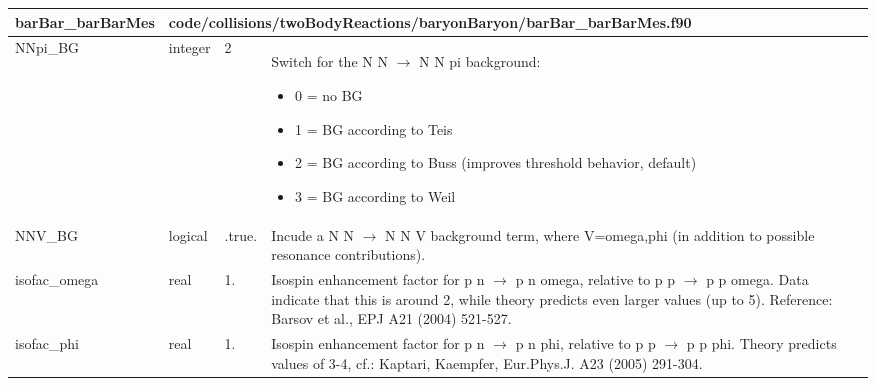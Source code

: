 \documentclass{article}
\begin{document}
\begin{longtable}{llll}
\toprule
\textbf{\large{barBar\_barBarMes}} & \multicolumn{3}{l}{\footnotesize{code/collisions/twoBodyReactions/baryonBaryon/barBar\_barBarMes.f90}}\\*
\midrule
\endfirsthead
\midrule
\endhead
NNpi\_BG & \begin{minipage}[t]{2cm}integer\end{minipage} & \begin{minipage}[t]{2cm}2\end{minipage} & \begin{minipage}[t]{12cm}Switch for the N N $\rightarrow$ N N pi background:\begin{itemize}\leftmargin0em\itemindent0pt\item 0 = no BG\item 1 = BG according to Teis\item 2 = BG according to Buss (improves threshold behavior, default)\item 3 = BG according to Weil\end{itemize}\end{minipage}\\*
\midrule
NNV\_BG & \begin{minipage}[t]{2cm}logical\end{minipage} & \begin{minipage}[t]{2cm}.true.\end{minipage} & \begin{minipage}[t]{12cm}Incude a N N $\rightarrow$ N N V background term, where V=omega,phi (in addition to possible resonance contributions).\end{minipage}\\*
\midrule
isofac\_omega & \begin{minipage}[t]{2cm}real\end{minipage} & \begin{minipage}[t]{2cm}1.\end{minipage} & \begin{minipage}[t]{12cm}Isospin enhancement factor for p n $\rightarrow$ p n omega, relative to p p $\rightarrow$ p p omega. Data indicate that this is around 2, while theory predicts even larger values (up to 5). Reference: Barsov et al., EPJ A21 (2004) 521-527.\end{minipage}\\*
\midrule
isofac\_phi & \begin{minipage}[t]{2cm}real\end{minipage} & \begin{minipage}[t]{2cm}1.\end{minipage} & \begin{minipage}[t]{12cm}Isospin enhancement factor for p n $\rightarrow$ p n phi, relative to p p $\rightarrow$ p p phi. Theory predicts values of 3-4, cf.: Kaptari, Kaempfer, Eur.Phys.J. A23 (2005) 291-304.\end{minipage}\\*
\bottomrule
\end{longtable}
{ }
\end{document}

